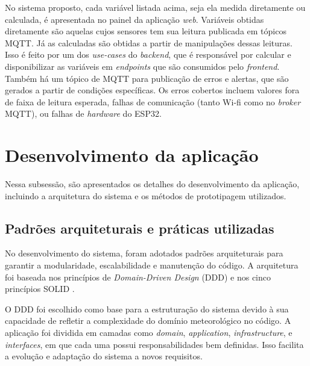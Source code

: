 No sistema proposto, cada variável listada acima, seja ela medida diretamente ou calculada, é apresentada no painel da aplicação \textit{web}. Variáveis obtidas diretamente são aquelas cujos sensores tem sua leitura publicada em tópicos MQTT. Já as calculadas são obtidas a partir de manipulações dessas leituras. Isso é feito por um dos \textit{use-cases} do \textit{backend}, que é responsável por calcular e disponibilizar as variáveis em \textit{endpoints} que são consumidos pelo \textit{frontend}. Também há um tópico de MQTT para publicação de erros e alertas, que são gerados a partir de condições específicas. Os erros cobertos incluem valores fora de faixa de leitura esperada, falhas de comunicação (tanto Wi-fi como no \textit{broker} MQTT), ou falhas de \textit{hardware} do ESP32.

\section{Desenvolvimento da aplicação}
Nessa subsessão, são apresentados os detalhes do desenvolvimento da aplicação, incluindo a arquitetura do sistema e os métodos de prototipagem utilizados.

\subsection{Padrões arquiteturais e práticas utilizadas}

No desenvolvimento do sistema, foram adotados padrões arquiteturais para garantir a modularidade, escalabilidade e manutenção do código. A arquitetura foi baseada nos princípios de \textit{Domain-Driven Design} (DDD) e nos cinco princípios SOLID \parencite{ddd_eric2004}.

O DDD foi escolhido como base para a estruturação do sistema devido à sua capacidade de refletir a complexidade do domínio meteorológico no código. A aplicação foi dividida em camadas como \textit{domain}, \textit{application}, \textit{infrastructure}, e \textit{interfaces}, em que cada uma possui responsabilidades bem definidas. Isso facilita a evolução e adaptação do sistema a novos requisitos.

